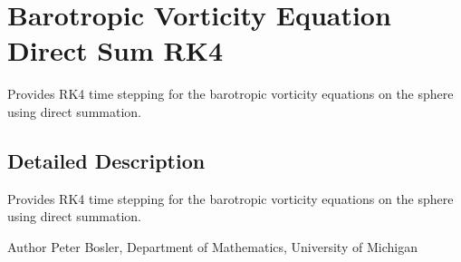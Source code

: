 \hypertarget{group__BVEDirectSum}{\section{Barotropic Vorticity Equation Direct Sum R\+K4}
\label{group__BVEDirectSum}
}


Provides R\+K4 time stepping for the barotropic vorticity equations on the sphere using direct summation.  




\subsection{Detailed Description}
Provides R\+K4 time stepping for the barotropic vorticity equations on the sphere using direct summation. 

\begin{DoxyAuthor}{Author}
Peter Bosler, Department of Mathematics, University of Michigan 
\end{DoxyAuthor}

